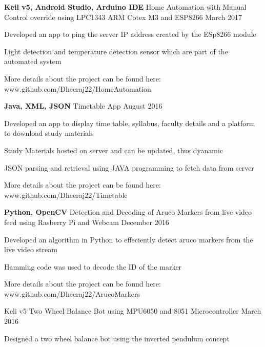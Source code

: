 \begin{cventries}
  \cventry
    {\textbf{Keil v5, Android Studio, Arduino IDE}}
    {Home Automation with Manual Control override using LPC1343 ARM Cotex M3 and ESP8266}
   {}
    {March 2017}
    {
      \begin{cvitems}
        \item {Developed an app to ping the server IP address created by the ESp8266 module}
         \item {Light detection and temperature detection sensor which are part of the automated system}
         \item {More details about the project can be found here: \textcolor{awesome-emerald}{www.github.com/Dheeraj22/HomeAutomation}}
      \end{cvitems}
    }
     \cventry
    {\textbf{Java, XML, JSON}}
    {Timetable App}
    {}
    {August 2016}
    {
      \begin{cvitems}
        \item {Developed an app to display time table, syllabus, faculty details and a platform to download study materials}
         \item {Study Materials hosted on server and can be updated, thus dyanamic}
         \item {JSON parsing and retrieval using JAVA programming to fetch data from server}
         \item {More details about the project can be found here: \textcolor{awesome-emerald}{www.github.com/Dheeraj22/Timetable}}
      \end{cvitems}
    }
    \cventry
    {\textbf{Python, OpenCV}}
    {Detection and Decoding of Aruco Markers from live video feed using Rasberry Pi and Webcam}
    {}
    {December 2016}
    {
      \begin{cvitems}
        \item {Developed an algorithm in Python to effeciently detect aruco markers from the live video stream}
         \item {Hamming code was used to decode the ID of the marker}
         \item {More details about the project can be found here: \textcolor{awesome-emerald}{www.github.com/Dheeraj22/ArucoMarkers}}
      \end{cvitems}
    }
     \cventry
    {Keli v5}
    {Two Wheel Balance Bot using MPU6050 and 8051 Microcontroller}
    {}
    {March 2016}
    {
      \begin{cvitems}
        \item {Designed a two wheel balance bot using the inverted pendulum concept}

\end{cvitems}}
\end{cventries}
